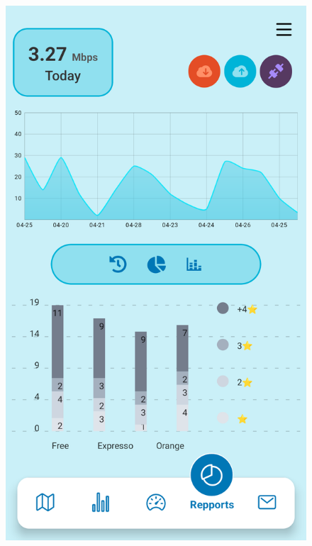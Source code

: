 \begin{figure}[H]
\begin{minipage}{0.35\textwidth}
    \label{fig:login-form-filled}
\end{minipage}\hfill
\begin{minipage}{0.35\textwidth}
    \centering
    \includegraphics[width=\linewidth]{images/sprint2/ReportingModule (4).png}
    \label{fig:login-form}
\end{minipage}\hfill
\end{figure}
